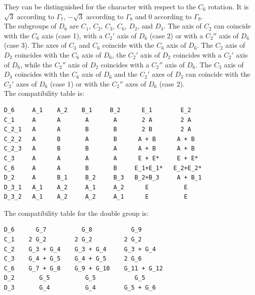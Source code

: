 \documentclass[12pt,a4paper]{article}
\begin{document}
They can be distinguished for the character with respect to the $C_6$ rotation.
It is $\sqrt{3}$ according to $\Gamma_7$, $-\sqrt{3}$ according to $\Gamma_8$ 
and $0$ according to $\Gamma_9$.\\
The subgroups of $D_6$ are $C_1$, $C_2$, $C_3$, $C_6$, $D_2$, and $D_3$. 
The axis of $C_2$ can coincide with the $C_6$ axis (case 1), with a $C_2'$ axis 
of $D_6$ (case 2) or with a $C_2''$ axis of $D_6$ (case 3). 
The axes of $C_3$ and $C_6$ coincide with the $C_6$ axis of $D_6$. 
The $C_2$ axis of $D_2$ coincides with the 
$C_6$ axis of $D_6$, the $C_2'$ axis of $D_2$ coincides with a $C_2'$ axis of $D_6$,
while the $C_2''$ axis of $D_2$ coincides with a $C_2''$ axis of $D_6$. 
The $C_3$ axis of $D_3$ coincides with the $C_6$ axis of $D_6$ and the $C_2'$ axes
of $D_3$ can coincide with the $C_2'$ axes of $D_6$ (case 1) or with the
$C_2''$ axes of $D_6$ (case 2).\\
The compatibility table is:
\begin{verbatim}
D_6     A_1    A_2    B_1     B_2      E_1        E_2
C_1     A      A       A       A       2 A        2 A
C_2_1   A      A       B       B       2 B        2 A
C_2_2   A      B       A       B      A + B      A + B
C_2_3   A      B       B       A      A + B      A + B
C_3     A      A       A       A      E + E*     E + E*      
C_6     A      A       B       B     E_1+E_1*   E_2+E_2*   
D_2     A      B_1     B_2     B_3   B_2+B_3     A + B_1
D_3_1   A_1    A_2     A_1     A_2      E          E
D_3_2   A_1    A_2     A_2     A_1      E          E
\end{verbatim}
The compatibility table for the double group is:
\begin{verbatim}
D_6      G_7          G_8           G_9 
C_1    2 G_2        2 G_2         2 G_2
C_2    G_3 + G_4    G_3 + G_4     G_3 + G_4
C_3    G_4 + G_5    G_4 + G_5     2 G_6
C_6    G_7 + G_8    G_9 + G_10    G_11 + G_12
D_2       G_5          G_5           G_5
D_3       G_4          G_4        G_5 + G_6
\end{verbatim}

\newpage
\end{document}
